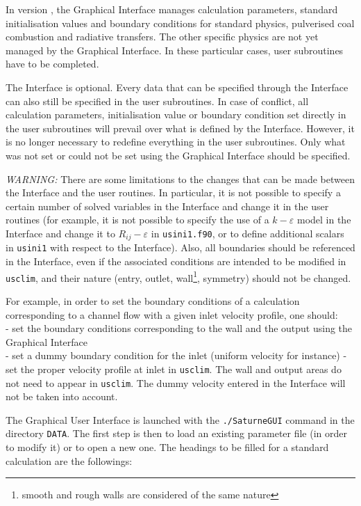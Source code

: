 {{{In version \verscs, the Graphical Interface manages calculation parameters,
standard initialisation values and boundary
conditions for standard physics, pulverised coal combustion and radiative
transfers. The other specific
physics are not yet managed by the Graphical
Interface. In these particular cases, user subroutines have to be completed.

The Interface is optional. Every data that can be specified through the
Interface can also still be specified in the user subroutines. In case of
conflict, all calculation parameters, initialisation value or boundary condition
set directly in the user subroutines will prevail over what is defined by the
Interface. However, it is no longer necessary to redefine everything in the
user subroutines. Only what was not set or could not be set using the Graphical
Interface should be specified.

{\em WARNING: }
There are some limitations to the changes that can be made between the Interface
and the user routines. In particular, it is not possible to specify a certain
number of solved variables in the Interface and change it in the user routines
(for example, it is not possible to specify the use of a $k-\varepsilon$ model
in the Interface and change it to $R_{ij}-\varepsilon$ in \texttt{usini1.f90}, or
to define additional scalars in \texttt{usini1} with respect to the
Interface). Also, all boundaries should be referenced in the Interface, even if
the associated conditions are intended to be modified in \texttt{usclim}, and
their nature (entry, outlet, wall\footnote{smooth and rough walls are considered
of the same nature}, symmetry) should not be changed.

For example, in order to set the boundary conditions of a calculation
corresponding to a channel flow with a given inlet velocity profile, one
should:\\
- set the boundary conditions corresponding to the wall and the output
using the Graphical Interface\\
- set a dummy boundary condition for the inlet (uniform velocity for instance)
- set the proper velocity profile at inlet in \texttt{usclim}. The wall and
output areas do not need to appear in \texttt{usclim}. The dummy velocity
entered in the Interface will not be taken into account.

The Graphical User Interface is launched with the \texttt{./SaturneGUI} command
in the directory \texttt{DATA}. The first step is
then to load an existing parameter file (in order to modify it) or to
open a new one. The headings to be filled for a standard calculation are the
followings:

}}}

